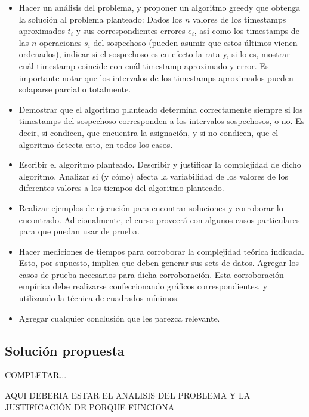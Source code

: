 \begin{itemize}
	\setlength{\leftskip}{3em} %
	\item Hacer un análisis del problema, y proponer un algoritmo greedy que obtenga la solución al problema planteado: Dados los $n$ valores de los timestamps aproximados \(t_i\) y sus correspondientes errores \(e_i\), así como los timestamps de las $n$ operaciones \(s_i\) del sospechoso (pueden asumir que estos últimos vienen ordenados), indicar si el sospechoso es en efecto la rata y, si lo es, mostrar cuál timestamp coincide con cuál timestamp aproximado y error. Es importante notar que los intervalos de los timestamps aproximados pueden solaparse parcial o totalmente.
	\item Demostrar que el algoritmo planteado determina correctamente siempre si los timestamps del sospechoso corresponden a los intervalos sospechosos, o no. Es decir, si condicen, que encuentra la asignación, y si no condicen, que el algoritmo detecta esto, en todos los casos.
	\item Escribir el algoritmo planteado. Describir y justificar la complejidad de dicho algoritmo. Analizar si (y cómo) afecta la variabilidad de los valores de los diferentes valores a los tiempos del algoritmo planteado.
	\item Realizar ejemplos de ejecución para encontrar soluciones y corroborar lo encontrado. Adicionalmente, el curso proveerá con algunos casos particulares para que puedan usar de prueba.
	\item Hacer mediciones de tiempos para corroborar la complejidad teórica indicada. Esto, por supuesto, implica que deben generar sus sets de datos. Agregar los casos de prueba necesarios para dicha corroboración. Esta corroboración empírica debe realizarse confeccionando gráficos correspondientes, y utilizando la técnica de cuadrados mínimos.
	\item Agregar cualquier conclusión que les parezca relevante.
\end{itemize}

\setlength{\leftskip}{0em}


\subsection{Solución propuesta}

COMPLETAR...

AQUI DEBERIA ESTAR EL ANALISIS DEL PROBLEMA Y LA JUSTIFICACIÓN DE PORQUE FUNCIONA








